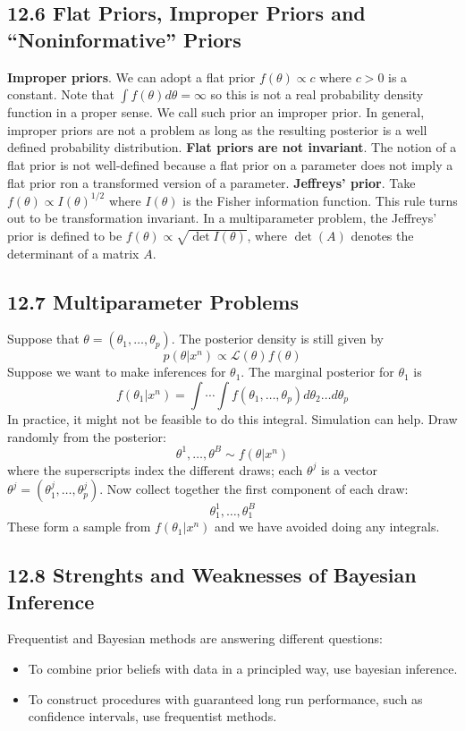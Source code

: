 \subsection*{12.6 Flat Priors, Improper Priors and ``Noninformative''
Priors}\label{flat-priors-improper-priors-and-noninformative-priors}
\textbf{Improper priors}. We can adopt a flat prior
\(f(\theta) \propto c\) where \(c > 0\) is a constant. Note that
\(\int f(\theta) d\theta = \infty\) so this is not a real probability
density function in a proper sense. We call such prior an improper
prior. In general, improper priors are not a problem as long as the
resulting posterior is a well defined probability distribution.
\textbf{Flat priors are not invariant}. The notion of a flat prior is
not well-defined because a flat prior on a parameter does not imply a
flat prior ron a transformed version of a parameter.
\textbf{Jeffreys' prior}. Take \(f(\theta) \propto I(\theta)^{1/2}\)
where \(I(\theta)\) is the Fisher information function. This rule turns
out to be transformation invariant.
In a multiparameter problem, the Jeffreys' prior is defined to be
\(f(\theta) \propto \sqrt{\det I(\theta)}\), where
\(\det(A)\) denotes the determinant of a matrix \(A\).

\subsection*{12.7 Multiparameter
Problems}\label{multiparameter-problems}
Suppose that \(\theta = (\theta_{1}, \dots, \theta_p)\). The posterior
density is still given by
\[
p(\theta | x^{n}) \propto \mathcal{L}(\theta) f(\theta)
\]
Suppose we want to make inferences for \(\theta_{1}\). The marginal
posterior for \(\theta_{1}\) is
\[
f(\theta_{1} | x^{n}) = \int \cdots \int f(\theta_{1}, \dots, \theta_p) d\theta_{2} \dots d\theta_p
\]
In practice, it might not be feasible to do this integral. Simulation
can help. Draw randomly from the posterior:
\[
\theta^{1}, \dots, \theta^B \sim f(\theta | x^{n})
\]
where the superscripts index the different draws; each \(\theta^{j}\) is a
vector \(\theta^{j} = (\theta^{j}_{1}, \dots, \theta^{j}_p)\). Now collect
together the first component of each draw:
\[
\theta^{1}_{1}, \dots, \theta^B_{1}
\]
These form a sample from \(f(\theta_{1} | x^{n})\) and we have avoided doing
any integrals.

\subsection*{12.8 Strenghts and Weaknesses of Bayesian
Inference}\label{strenghts-and-weaknesses-of-bayesian-inference}
Frequentist and Bayesian methods are answering different questions:
\begin{itemize}[tightlist]
\item
  To combine prior beliefs with data in a principled way, use bayesian
  inference.
\item
  To construct procedures with guaranteed long run performance, such as
  confidence intervals, use frequentist methods.
\end{itemize}

